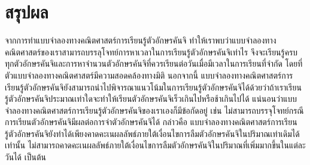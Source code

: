 \documentclass{article}
\begin{document}
\section{สรุปผล}
จากการทำแบบจำลองทางคณิตศาสตร์การเรียนรู้ตัวอักษรคันจิ ทำให้เราพบว่าแบบจำลองทางคณิตศาสตร์ของเราสามารถบรรลุโจทย์การหาเวลาในการเรียนรู้ตัวอักษรคันจิเท่าไร จึงจะเรียนรู้ครบทุกตัวอักษรคันจิและการหาจำนวนตัวอักษรคันจิที่ควรเรียนต่อวันเมื่อมีเวลาในการเรียนที่จำกัด โดยที่ตัวแบบจำลองทางคณิตศาสตร์มีความสอดคล้องทางมิติ นอกจากนี้ แบบจำลองทางคณิตศาสตร์การเรียนรู้ตัวอักษรคันจิยังสามารถนำไปพิจารณาแนวโน้มในการเรียนรู้ตัวอักษรคันจิได้ด้วยว่าถ้าเราเรียนรู้ตัวอักษรคันจิประมาณเท่าใดจะทำให้เรียนตัวอักษรคันจิเร็วเกินไปหรือช้าเกินไปได้ แน่นอนว่าแบบจำลองทางคณิตศาสตร์การเรียนรู้ตัวอักษรคันจิของเราเองก็มีข้อกัดอยู่ เช่น ไม่สามารถบรรจุโจทย์กรณีการเรียนตัวอักษรคันจิมีผลต่อการจำตัวอักษรคันจิได้ กล่าวคือ แบบจำลองทางคณิตศาสตร์การเรียนรู้ตัวอักษรคันจิยังทำได้เพียงคาดคะเนผลลัพธ์ภายใต้เงื่อนไขการลืมตัวอักษรคันจิในปริมาณเท่าเดิมได้เท่านั้น ไม่สามารถคาดคะเนผลลัพธ์ภายใต้เงื่อนไขการลืมตัวอักษรคันจิในปริมาณที่เพิ่มมากขึ้นในแต่ละวันได้ เป็นต้น

\printbibliography
\end{document}
